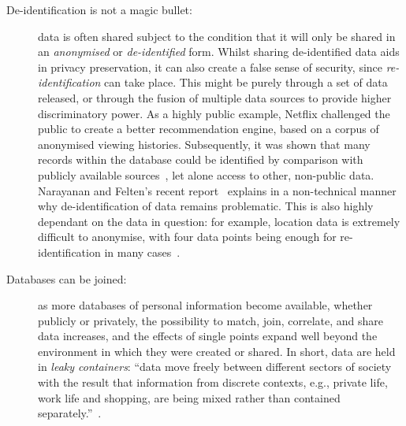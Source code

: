 \documentclass{IOS-Book-Article}     %
\newcommand{\tbox}[3][red]{{
\color{#1}\noindent{
   \fbox{\scriptsize{ {\bf #2} \textsl{#3}}}
   \vspace{2pt}
}
}}
\newcommand{\todo}[1]{\tbox{TODO:}{#1}}
\begin{document}
\begin{description}
\item[De-identification is not a magic bullet:] data is often shared subject to
the condition that it will only be shared in an \emph{anonymised} or
\emph{de-identified} form. Whilst sharing de-identified data aids in privacy
preservation, it can also create a false sense of security, since
\emph{re-identification} can take place. This might be purely through a set of
data released, or through the fusion of multiple data sources to provide higher
discriminatory power. As a highly public example, Netflix challenged the public
to create a better recommendation engine, based on a corpus of anonymised viewing histories. Subsequently, it was shown that many records within the database could be identified by comparison with publicly available sources~\cite{narayanan2008Deanon}, let alone access to other, non-public data.
Narayanan and Felten's recent report~\cite{narayanan2014Deidentification} explains in a non-technical manner why
de-identification of data remains problematic. This is also highly dependant on
the data in question: for example, location data is extremely difficult to
anonymise, with four data points being enough for 
re-identification in many cases~\cite{montjoye2013Unique}.

\item[Databases can be joined:] as more databases of personal information
become available, whether publicly or privately, the possibility to match, join,
correlate, and share data increases, and the effects of single points expand well
beyond the environment in which they were created or shared. In short, data are
held in \emph{leaky containers}: ``data move freely between different sectors of
society with the result that information from discrete contexts, e.g.,
 private life, work life and shopping, are being mixed rather than contained 
 separately.''~\cite[p.37--44]{lyon2001surveillance}.
\end{description}


\end{document}
